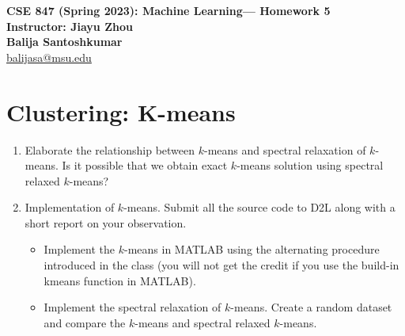 \documentclass[11pt]{article}
\begin{document}
\thispagestyle {empty}

\newcommand{\lsp}[1]{\large\renewcommand{\baselinestretch}{#1}\normalsize}
\newcommand{\hsp}{\hspace{.2in}}
\newcommand{\comment}[1]{}
\newtheorem{thm}{Theorem}[section]
\newtheorem{lem}{Lemma}[section]
\newtheorem{cor}{Corollary}[section]
\newtheorem{prop}{Proposition}[section]
\newtheorem{problem}{Problem}[section]

\newcommand{\R}{{\rm\hbox{I\kern-.15em R}}}
\newcommand{\IR}{{\rm\hbox{I\kern-.15em R}}}
\newcommand{\IN}{{\rm\hbox{I\kern-.15em N}}}
\newcommand{\IZ}{{\sf\hbox{Z\kern-.40em Z}}}
\newcommand{\IS}{{\rm\hbox{S\kern-.45em S}}}
\newcommand{\Real}{I\!\!R}


\newcommand{\linesep}{\vspace{.2cm}\hrule\vspace{0.2cm}}
\newcommand{\categorysep}{\vspace{0.5cm}}
\newcommand{\entrysep}{\vspace{0cm}}

\newcommand{\category}[1]{\categorysep
                  \noindent {\bf \large #1}
              \linesep}

\pagestyle{empty}

\begin{center}
{\large \textbf{CSE 847 (Spring 2023): Machine Learning--- Homework 5\\
 Instructor: Jiayu Zhou \\
  Balija Santoshkumar}} \\
\href{mailto:balijasa@msu.edu}{balijasa@msu.edu}
\end{center}
\section{ Clustering: K-means}

\begin{enumerate}
\item  Elaborate the relationship between $k$-means and spectral relaxation of $k$-means. Is it possible that we obtain exact $k$-means solution using spectral relaxed $k$-means?
\item Implementation of $k$-means. Submit all the source code to D2L along with a short report on your observation.
\begin{itemize}
	\item Implement the $k$-means in MATLAB using the alternating procedure introduced in the class (you will not get the credit if you use the build-in kmeans function in MATLAB).
\item  Implement the spectral relaxation of $k$-means. Create a random dataset and compare the $k$-means and spectral relaxed $k$-means.
\end{itemize}
\end{enumerate}
\end{document}
